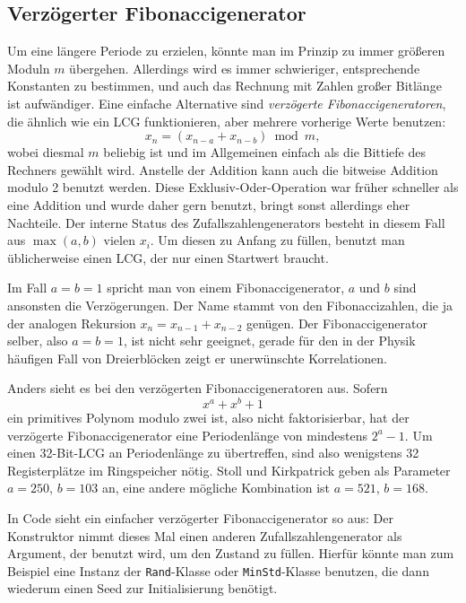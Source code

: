 \subsection{Verzögerter Fibonaccigenerator}

Um eine längere Periode zu erzielen, könnte man im Prinzip zu immer
größeren Moduln $m$ übergehen. Allerdings wird es immer schwieriger,
entsprechende Konstanten zu bestimmen, und auch das Rechnung mit
Zahlen großer Bitlänge ist aufwändiger. Eine einfache Alternative
sind \emph{verzögerte Fibonaccigeneratoren}, die ähnlich wie ein LCG
funktionieren, aber mehrere vorherige Werte benutzen:
\begin{equation}
  x_n = (x_{n-a} + x_{n-b}) \bmod m,
\end{equation}
wobei diesmal $m$ beliebig ist und im Allgemeinen einfach als die
Bittiefe des Rechners gewählt wird. Anstelle der Addition kann auch
die bitweise Addition modulo 2 benutzt werden.  Diese
Exklusiv-Oder-Operation war früher schneller als eine Addition und
wurde daher gern benutzt, bringt sonst allerdings eher Nachteile.  Der
interne Status des Zufallszahlengenerators besteht in diesem Fall aus
$\max(a,b)$ vielen $x_i$.  Um diesen zu Anfang zu füllen, benutzt man
üblicherweise einen LCG, der nur einen Startwert braucht.

Im Fall $a=b=1$ spricht man von einem Fibonaccigenerator, $a$ und $b$
sind ansonsten die Verzögerungen. Der Name stammt von den
Fibonaccizahlen, die ja der analogen Rekursion $x_n = x_{n-1} +
x_{n-2}$ genügen. Der Fibonaccigenerator selber, also $a=b=1$, ist
nicht sehr geeignet, gerade für den in der Physik häufigen Fall von
Dreierblöcken zeigt er unerwünschte Korrelationen.

Anders sieht es bei den verzögerten Fibonaccigeneratoren aus. Sofern
\begin{equation}
  x^a + x^b + 1
\end{equation}
ein primitives Polynom modulo zwei ist, also nicht faktorisierbar, hat
der verzögerte Fibonaccigenerator eine Periodenlänge von mindestens
$2^a-1$. Um einen 32-Bit-LCG an Periodenlänge zu übertreffen,
sind also wenigstens 32 Registerplätze im Ringspeicher nötig. Stoll
und Kirkpatrick geben als Parameter $a=250$, $b=103$ an, eine andere
mögliche Kombination ist $a=521$, $b=168$.

In Code sieht ein einfacher verzögerter Fibonaccigenerator so aus:
%
Der Konstruktor nimmt dieses Mal einen anderen Zufallszahlengenerator
als Argument, der benutzt wird, um den Zustand zu füllen. Hierfür
könnte man zum Beispiel eine Instanz der \lstinline!Rand!-Klasse oder
\lstinline!MinStd!-Klasse benutzen, die dann wiederum einen Seed zur
Initialisierung benötigt.


